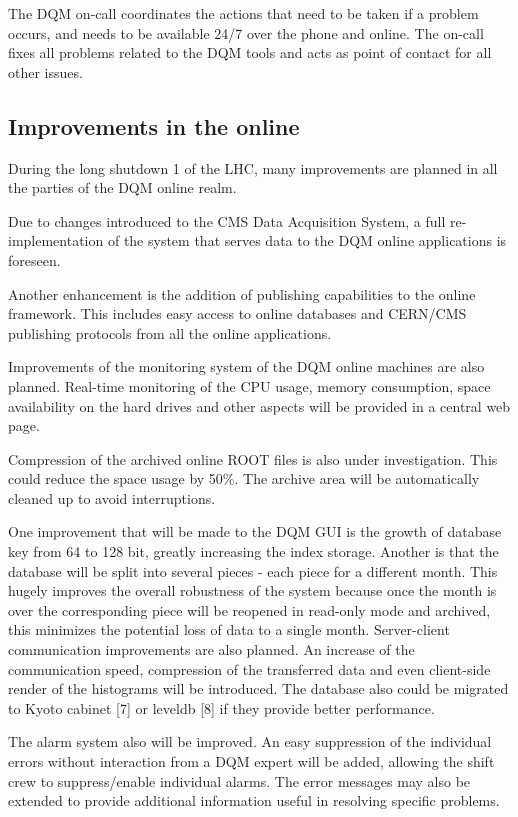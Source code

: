 \documentclass[journal]{IEEEtran}
\begin{document}
The DQM on-call coordinates the actions that need to be taken if a problem occurs, and needs to be available 24/7 over the phone and online. The on-call fixes all problems related to the DQM tools and acts as point of contact for all other issues.

\subsection{Improvements in the online}
During the long shutdown 1 of the LHC, many improvements are planned in all the parties of the DQM online realm.

Due to changes introduced to the CMS Data Acquisition System, a full re-implementation of the system that serves data to the DQM online applications is foreseen.

Another enhancement is the addition of publishing capabilities to the online framework. This includes easy access to online databases and CERN/CMS publishing protocols from all the online applications.

Improvements of the monitoring system of the DQM online machines are also planned. Real-time monitoring of the CPU usage, memory consumption, space availability on the hard drives and other aspects will be provided in a central web page.

Compression of the archived online ROOT files is also under investigation. This could reduce the space usage by 50\%. The archive area will be automatically cleaned up to avoid interruptions.

One improvement that will be made to the DQM GUI is the growth of database key from 64 to 128 bit, greatly increasing the index storage. Another is that the database will be split into several pieces - each piece for a different month. This hugely improves the overall robustness of the system because once the month is over the corresponding piece will be reopened in read-only mode and archived, this minimizes the potential loss of data to a single month. Server-client communication improvements are also planned. An increase of the communication speed, compression of the transferred data and even client-side render of the histograms will be introduced. The database also could be migrated to Kyoto cabinet [7] or leveldb [8] if they provide better performance.

The alarm system also will be improved. An easy suppression of the individual errors without interaction from a DQM expert will be added, allowing the shift crew to suppress/enable individual alarms. The error messages may also be extended to provide additional information useful in resolving specific problems.
\end{document}
